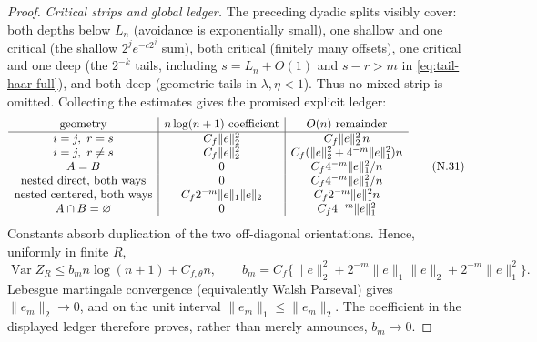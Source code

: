 \documentclass[11pt]{article}
\numberwithin{equation}{section}
\newcommand{\Var}{\operatorname{Var}}\newcommand{\Cov}{\operatorname{Cov}}
\newcommand{\1}{\mathbf 1}\newcommand{\F}{\mathcal F}\newcommand{\D}{\mathcal D}
\newcommand{\norm}[1]{\lVert#1\rVert}
\begin{document}
\begin{proof}
\emph{Critical strips and global ledger.}
The preceding dyadic splits visibly cover: both depths below $L_n$ (avoidance
is exponentially small), one shallow and one critical (the shallow
$2^je^{-c2^j}$ sum), both critical (finitely many offsets), one critical and
one deep (the $2^{-k}$ tails, including $s=L_n+O(1)$ and $s-r>m$ in
\eqref{eq:tail-haar-full}), and both deep (geometric tails in $\lambda,
\eta<1$).  Thus no mixed strip is omitted.  Collecting the estimates gives
the promised explicit ledger:
\[
\begin{array}{c|c|c}
\hbox{geometry}&n\log(n+1)\hbox{ coefficient}&O(n)\hbox{ remainder} \\ \hline
 i=j,\ r=s& C_f\norm e_2^2&C_f\norm e_2^2\,n \\
 i=j,\ r\ne s&C_f\norm e_2^2&C_f(\norm e_2^2+4^{-m}\norm e_1^2)n \\
 A=B&0&C_f4^{-m}\norm e_1^2/n \\
 \hbox{nested direct, both ways}&0&C_f4^{-m}\norm e_1^2/n \\
 \hbox{nested centered, both ways}&C_f2^{-m}\norm e_1\norm e_2&C_f2^{-m}\norm e_1^2n \\
 A\cap B=\varnothing&0&C_f4^{-m}\norm e_1^2 \\
\end{array}                                                    \tag{N.31}
\]
Constants absorb duplication of the two off-diagonal orientations.  Hence,
uniformly in finite $R$,
\begin{equation}\label{eq:tail-finite-bound}
 \Var Z_R\le b_m n\log(n+1)+C_{f,\theta}n,\qquad
 b_m=C_f\{\norm e_2^2+2^{-m}\norm e_1\norm e_2
                         +2^{-m}\norm e_1^2\}.
\end{equation}
Lebesgue martingale convergence (equivalently Walsh Parseval) gives
$\norm{e_m}_2\to0$, and on the unit interval $\norm{e_m}_1\le\norm{e_m}_2$.
The coefficient in the displayed ledger therefore proves, rather than merely
announces, $b_m\to0$.


\end{proof}
\end{document}

